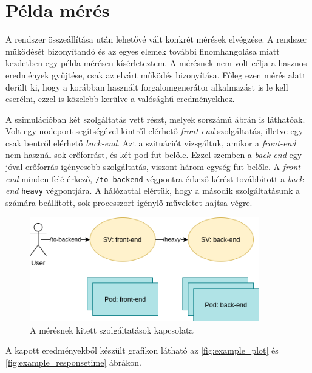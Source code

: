 \section{Példa mérés}
A rendszer összeállítása után lehetővé vált konkrét mérések elvégzése.
A rendszer működését bizonyítandó és az egyes elemek további finomhangolása miatt kezdetben egy példa mérésen kísérleteztem.
A mérésnek nem volt célja a hasznos eredmények gyűjtése, csak az elvárt működés bizonyítása. 
Főleg ezen mérés alatt derült ki, hogy a korábban használt forgalomgenerátor alkalmazást is le kell cserélni, ezzel is közelebb kerülve a valósághű eredményekhez.

A szimulációban két szolgáltatás vett részt, melyek  sorszámú ábrán is láthatóak.
Volt egy nodeport segítségével kintről elérhető \textit{front-end} szolgáltatás, illetve egy csak bentről elérhető \textit{back-end}.
Azt a szituációt vizsgáltuk, amikor a \textit{front-end} nem használ sok erőforrást, és két pod fut belőle.
Ezzel szemben a \textit{back-end} egy jóval erőforrás igényesebb szolgáltatás, viszont három egység fut belőle.
A \textit{front-end} minden felé érkező, \verb+/to-backend+ végpontra érkező kérést továbbított a \textit{back-end} \verb+heavy+ végpontjára.
A hálózattal elértük, hogy a második szolgáltatásunk a számára beállított, sok processzort igénylő műveletet hajtsa végre.

\begin{figure}[!ht]
\centering
\includegraphics[width=100mm, keepaspectratio]{figures/sample_measurement.png}
\caption{A mérésnek kitett szolgáltatások kapcsolata}
\label{fig:sample_sg}
\end{figure}

A kapott eredményekből készült grafikon látható az \ref{fig:example_plot} és \ref{fig:example_responsetime} ábrákon. 

